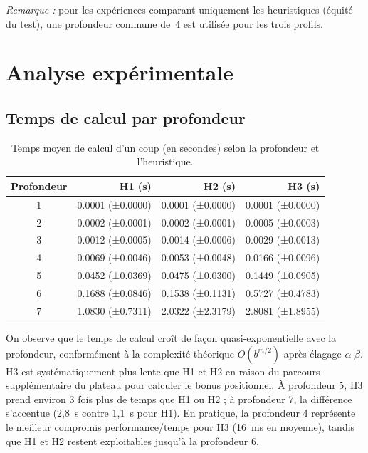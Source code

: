 \documentclass[12pt, a4paper]{article}
\begin{document}
\noindent\textit{Remarque :} pour les expériences comparant uniquement les heuristiques (équité
du test), une profondeur commune de~4 est utilisée pour les trois profils.

\section{Analyse expérimentale}
\label{sec:analyse_exp}

\subsection{Temps de calcul par profondeur}
\label{sec:temps}

\begin{table}[H]
  \centering
  \caption{Temps moyen de calcul d'un coup (en secondes) selon la profondeur et l'heuristique.}
  \label{tab:temps}
  \begin{tabular}{crrr}
    \toprule
    Profondeur & H1 (s) & H2 (s) & H3 (s) \\
    \midrule
    1 & 0.0001 (±0.0000) & 0.0001 (±0.0000) & 0.0001 (±0.0000) \\
    2 & 0.0002 (±0.0001) & 0.0002 (±0.0001) & 0.0005 (±0.0003) \\
    3 & 0.0012 (±0.0005) & 0.0014 (±0.0006) & 0.0029 (±0.0013) \\
    4 & 0.0069 (±0.0046) & 0.0053 (±0.0048) & 0.0166 (±0.0096) \\
    5 & 0.0452 (±0.0369) & 0.0475 (±0.0300) & 0.1449 (±0.0905) \\
    6 & 0.1688 (±0.0846) & 0.1538 (±0.1131) & 0.5727 (±0.4783) \\
    7 & 1.0830 (±0.7311) & 2.0322 (±2.3179) & 2.8081 (±1.8955) \\
    \bottomrule
  \end{tabular}
\end{table}

On observe que le temps de calcul croît de façon quasi-exponentielle avec la profondeur,
conformément à la complexité théorique $O(b^{m/2})$ après élagage $\alpha\text{-}\beta$.
H3 est systématiquement plus lente que H1 et H2 en raison du parcours supplémentaire
du plateau pour calculer le bonus positionnel. À profondeur 5, H3 prend environ 3 fois
plus de temps que H1 ou H2 ; à profondeur 7, la différence s'accentue (2,8~s contre 1,1~s
pour H1). En pratique, la profondeur 4 représente le meilleur compromis performance/temps
pour H3 (16~ms en moyenne), tandis que H1 et H2 restent exploitables jusqu'à la profondeur 6.
\end{document}

